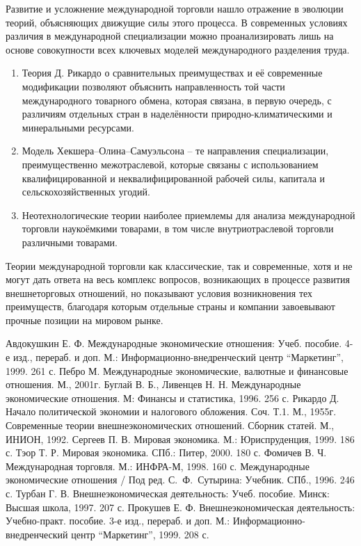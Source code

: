 Развитие и усложнение международной торговли нашло отражение в эволюции теорий,
объясняющих движущие силы этого процесса. В современных условиях различия в
международной специализации можно проанализировать лишь на основе совокупности
всех ключевых моделей международного разделения труда.
\begin{enumerate}
    \item Теория Д. Рикардо о сравнительных преимуществах и её современные
    модификации позволяют объяснить направленность той части международного
    товарного обмена, которая связана, в первую очередь, с различиям отдельных
    стран в наделённости природно-климатическими и минеральными ресурсами.
    
    \item Модель Хекшера--Олина--Самуэльсона -- те направления специализации,
    преимущественно межотраслевой, которые связаны с использованием
    квалифицированной и неквалифицированной рабочей силы, капитала и
    сельскохозяйственных угодий.
    
    \item Неотехнологические теории наиболее приемлемы для анализа международной
    торговли наукоёмкими товарами, в том числе внутриотраслевой торговли
    различными товарами.
\end{enumerate}

Теории международной торговли как классические, так и современные, хотя и не
могут дать ответа на весь комплекс вопросов, возникающих в процессе развития
внешнеторговых отношений, но показывают условия возникновения тех преимуществ,
благодаря которым отдельные страны и компании завоевывают прочные позиции на
мировом рынке.

\newpage %
\renewcommand{\bibname}{Список литературы}

\begin{thebibliography}{99} 
     Авдокушкин Е. Ф. Международные экономические отношения: Учеб.
    пособие. 4-е изд., перераб. и доп. М.: Информационно-внедренческий центр
    ``Маркетинг'', 1999. 261 с.
     Пебро М. Международные экономические, валютные и финансовые
    отношения. М., 2001г.
     Буглай В. Б., Ливенцев Н. Н. Международные экономические
    отношения. М: Финансы и статистика, 1996. 256 с.
     Рикардо Д. Начало политической экономии и налогового обложения.
    Соч. Т.1. М., 1955г.
     Современные теории внешнеэкономических отношений. Сборник
    статей. М., ИНИОН, 1992.
     Сергеев П. В. Мировая экономика. М.: Юриспруденция, 1999. 186 с.
     Тэор Т. Р. Мировая экономика. СПб.: Питер, 2000. 180 с.
     Фомичев В. Ч. Международная торговля. М.: ИНФРА-М, 1998. 160 с.
     Международные экономические отношения / Под ред. С.~Ф.~Сутырина:
    Учебник. СПб., 1996. 246 с.
     Турбан Г. В. Внешнеэкономическая деятельность: Учеб. пособие.
    Минск: Высшая школа, 1997. 207 с.
     Прокушев Е. Ф. Внешнеэкономическая деятельность: Учебно-практ.
    пособие. 3-е изд., перераб. и доп. М.: Информационно-внедренческий центр
    ``Маркетинг'', 1999. 208 с.
\end{thebibliography}